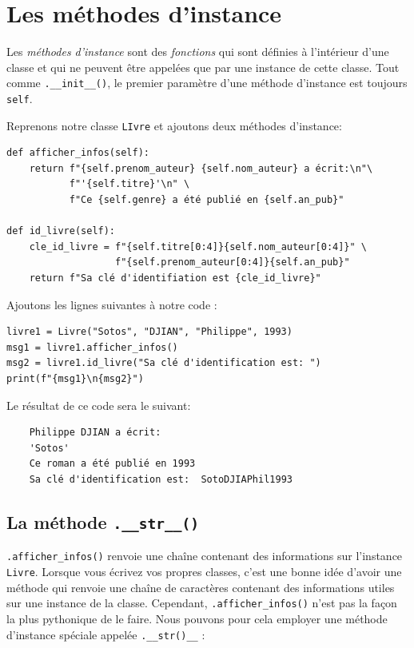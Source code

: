 \documentclass[a4paper,12pt]{book}
\begin{document}
\section{Les méthodes d'instance}
Les \textit{méthodes d'instance} sont des \textit{fonctions} qui sont définies à l'intérieur d'une classe et qui ne peuvent être appelées que par une instance de cette classe. Tout comme \texttt{.\_\_init\_\_()}, le premier paramètre d'une méthode d'instance est toujours \texttt{self}.
\medskip

Reprenons notre classe \texttt{LIvre} et ajoutons deux méthodes d'instance:
\begin{lstlisting}[caption=Méthodes d'instance]
def afficher_infos(self):
    return f"{self.prenom_auteur} {self.nom_auteur} a écrit:\n"\
           f"'{self.titre}'\n" \
           f"Ce {self.genre} a été publié en {self.an_pub}"

def id_livre(self):
    cle_id_livre = f"{self.titre[0:4]}{self.nom_auteur[0:4]}" \
                   f"{self.prenom_auteur[0:4]}{self.an_pub}"
    return f"Sa clé d'identifiation est {cle_id_livre}"
\end{lstlisting}
\medskip

Ajoutons les lignes suivantes à notre code :
\begin{lstlisting}[caption=Accéder aux méthodes d'instance]
livre1 = Livre("Sotos", "DJIAN", "Philippe", 1993)
msg1 = livre1.afficher_infos()
msg2 = livre1.id_livre("Sa clé d'identification est: ")
print(f"{msg1}\n{msg2}")
\end{lstlisting}
\medskip

Le résultat de ce code sera le suivant:
\begin{verbatim}
    Philippe DJIAN a écrit:
    'Sotos'
    Ce roman a été publié en 1993
    Sa clé d'identification est:  SotoDJIAPhil1993
\end{verbatim}
\medskip

\subsection*{La méthode \texttt{.\_\_str\_\_()}}
\texttt{.afficher\_infos()} renvoie une chaîne contenant des informations sur l'instance \texttt{Livre}. Lorsque vous écrivez vos propres classes, c'est une bonne idée d'avoir une méthode qui renvoie une chaîne de caractères contenant des informations utiles sur une instance de la classe. Cependant, \texttt{.afficher\_infos()} n'est pas la façon la plus pythonique de le faire. Nous pouvons pour cela employer une méthode d’instance spéciale appelée \texttt{.\_\_str()\_\_} :
\medskip
\end{document}
